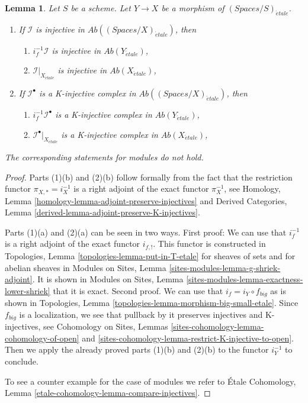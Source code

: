 \documentclass{stacks-project}
\theoremstyle{plain}
\newtheorem{lemma}[subsection]{Lemma}
\theoremstyle{definition}
\theoremstyle{remark}
\numberwithin{equation}{subsection}
\def\etale{{\acute{e}tale}}
\begin{document}
\begin{lemma}
\label{lemma-compare-injectives}
Let $S$ be a scheme.
Let $Y \to X$ be a morphism of $(\textit{Spaces}/S)_\etale$.
\begin{enumerate}
\item If $\mathcal{I}$ is injective in
$\textit{Ab}((\textit{Spaces}/X)_\etale)$, then
\begin{enumerate}
\item $i_f^{-1}\mathcal{I}$ is injective in $\textit{Ab}(Y_\etale)$,
\item $\mathcal{I}|_{X_\etale}$ is injective in $\textit{Ab}(X_\etale)$,
\end{enumerate}
\item If $\mathcal{I}^\bullet$ is a K-injective complex
in $\textit{Ab}((\textit{Spaces}/X)_\etale)$, then
\begin{enumerate}
\item $i_f^{-1}\mathcal{I}^\bullet$ is a K-injective complex in
$\textit{Ab}(Y_\etale)$,
\item $\mathcal{I}^\bullet|_{X_\etale}$ is a K-injective complex in
$\textit{Ab}(X_\etale)$,
\end{enumerate}
\end{enumerate}
The corresponding statements for modules do not hold.
\end{lemma}

\begin{proof}
Parts (1)(b) and (2)(b)
follow formally from the fact that the restriction functor
$\pi_{X, *} = i_X^{-1}$ is a right adjoint of the exact functor
$\pi_X^{-1}$, see
Homology, Lemma \ref{homology-lemma-adjoint-preserve-injectives} and
Derived Categories, Lemma \ref{derived-lemma-adjoint-preserve-K-injectives}.

\medskip\noindent
Parts (1)(a) and (2)(a) can be seen in two ways. First proof: We can use
that $i_f^{-1}$ is a right adjoint of the exact functor $i_{f, !}$.
This functor is constructed in
Topologies, Lemma \ref{topologies-lemma-put-in-T-etale}
for sheaves of sets and for abelian sheaves in
Modules on Sites, Lemma \ref{sites-modules-lemma-g-shriek-adjoint}.
It is shown in Modules on Sites, Lemma
\ref{sites-modules-lemma-exactness-lower-shriek} that it is exact.
Second proof. We can use that $i_f = i_Y \circ f_{big}$ as is shown
in Topologies, Lemma \ref{topologies-lemma-morphism-big-small-etale}.
Since $f_{big}$ is a localization, we see that pullback by it
preserves injectives and K-injectives, see
Cohomology on Sites, Lemmas \ref{sites-cohomology-lemma-cohomology-of-open} and
\ref{sites-cohomology-lemma-restrict-K-injective-to-open}.
Then we apply the already proved parts (1)(b) and (2)(b)
to the functor $i_Y^{-1}$ to conclude.

\medskip\noindent
To see a counter example for the case of modules we refer to
\'Etale Cohomology, Lemma \ref{etale-cohomology-lemma-compare-injectives}.
\end{proof}
\end{document}
